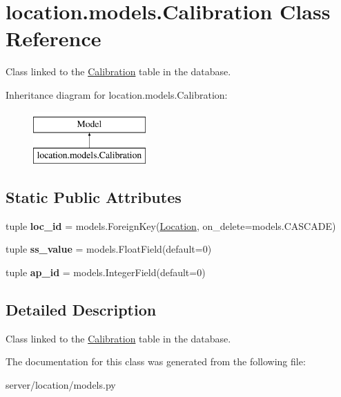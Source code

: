 \hypertarget{classlocation_1_1models_1_1Calibration}{\section{location.\-models.\-Calibration Class Reference}
\label{classlocation_1_1models_1_1Calibration}
}


Class linked to the \hyperlink{classlocation_1_1models_1_1Calibration}{Calibration} table in the database.  


Inheritance diagram for location.\-models.\-Calibration\-:\begin{figure}[H]
\begin{center}
\leavevmode
\includegraphics[height=2.000000cm]{classlocation_1_1models_1_1Calibration}
\end{center}
\end{figure}
\subsection*{Static Public Attributes}
\begin{DoxyCompactItemize}
\item 
\hypertarget{classlocation_1_1models_1_1Calibration_a60d6df8ce1d7517f7f30b068db0ae321}{tuple {\bfseries loc\-\_\-id} = models.\-Foreign\-Key(\hyperlink{classlocation_1_1models_1_1Location}{Location}, on\-\_\-delete=models.\-C\-A\-S\-C\-A\-D\-E)}\label{classlocation_1_1models_1_1Calibration_a60d6df8ce1d7517f7f30b068db0ae321}

\item 
\hypertarget{classlocation_1_1models_1_1Calibration_ab8dd1e6169ab87e10ba1063f5e308d6d}{tuple {\bfseries ss\-\_\-value} = models.\-Float\-Field(default=0)}\label{classlocation_1_1models_1_1Calibration_ab8dd1e6169ab87e10ba1063f5e308d6d}

\item 
\hypertarget{classlocation_1_1models_1_1Calibration_a30217d1b23c0d4b8def552ddd1d2eb6c}{tuple {\bfseries ap\-\_\-id} = models.\-Integer\-Field(default=0)}\label{classlocation_1_1models_1_1Calibration_a30217d1b23c0d4b8def552ddd1d2eb6c}

\end{DoxyCompactItemize}


\subsection{Detailed Description}
Class linked to the \hyperlink{classlocation_1_1models_1_1Calibration}{Calibration} table in the database. 

The documentation for this class was generated from the following file\-:\begin{DoxyCompactItemize}
\item 
server/location/models.\-py\end{DoxyCompactItemize}
